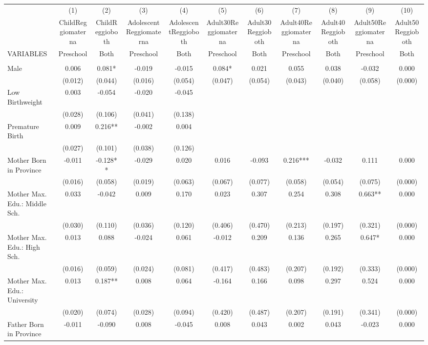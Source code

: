 \begin{tabular}{lcccccccccc} \hline
 & (1) & (2) & (3) & (4) & (5) & (6) & (7) & (8) & (9) & (10) \\
 & ChildReggiomaterna & ChildReggioboth & AdolescentReggiomaterna & AdolescentReggioboth & Adult30Reggiomaterna & Adult30Reggioboth & Adult40Reggiomaterna & Adult40Reggioboth & Adult50Reggiomaterna & Adult50Reggioboth \\
VARIABLES & Preschool & Both & Preschool & Both & Preschool & Both & Preschool & Both & Preschool & Both \\ \hline
 &  &  &  &  &  &  &  &  &  &  \\
Male & 0.006 & 0.081* & -0.019 & -0.015 & 0.084* & 0.021 & 0.055 & 0.038 & -0.032 & 0.000 \\
 & (0.012) & (0.044) & (0.016) & (0.054) & (0.047) & (0.054) & (0.043) & (0.040) & (0.058) & (0.000) \\
Low Birthweight & 0.003 & -0.054 & -0.020 & -0.045 &  &  &  &  &  &  \\
 & (0.028) & (0.106) & (0.041) & (0.138) &  &  &  &  &  &  \\
Premature Birth & 0.009 & 0.216** & -0.002 & 0.004 &  &  &  &  &  &  \\
 & (0.027) & (0.101) & (0.038) & (0.126) &  &  &  &  &  &  \\
Mother Born in Province & -0.011 & -0.128** & -0.029 & 0.020 & 0.016 & -0.093 & 0.216*** & -0.032 & 0.111 & 0.000 \\
 & (0.016) & (0.058) & (0.019) & (0.063) & (0.067) & (0.077) & (0.058) & (0.054) & (0.075) & (0.000) \\
Mother Max. Edu.: Middle Sch. & 0.033 & -0.042 & 0.009 & 0.170 & 0.023 & 0.307 & 0.254 & 0.308 & 0.663** & 0.000 \\
 & (0.030) & (0.110) & (0.036) & (0.120) & (0.406) & (0.470) & (0.213) & (0.197) & (0.321) & (0.000) \\
Mother Max. Edu.: High Sch. & 0.013 & 0.088 & -0.024 & 0.061 & -0.012 & 0.209 & 0.136 & 0.265 & 0.647* & 0.000 \\
 & (0.016) & (0.059) & (0.024) & (0.081) & (0.417) & (0.483) & (0.207) & (0.192) & (0.333) & (0.000) \\
Mother Max. Edu.: University & 0.013 & 0.187** & 0.008 & 0.064 & -0.164 & 0.166 & 0.098 & 0.297 & 0.524 & 0.000 \\
 & (0.020) & (0.074) & (0.028) & (0.094) & (0.420) & (0.487) & (0.207) & (0.191) & (0.341) & (0.000) \\
Father Born in Province & -0.011 & -0.090 & 0.008 & -0.045 & 0.008 & 0.043 & 0.002 & 0.043 & -0.023 & 0.000 \\

\end{tabular}
